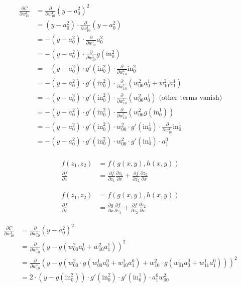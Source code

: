 \documentclass{article}
\begin{document}
    \def\inn{\text{in}}
    \begin{align*}
        \frac{\partial C}{\partial w_{10}^1} 
        &= \frac{\partial}{\partial w_{10}^1} (y-a_0^2)^2 \\
        &= (y-a_0^2)\cdot \frac{\partial}{\partial w_{10}^1} (y-a_0^2) \\
        &= -(y-a_0^2)\cdot \frac{\partial}{\partial w_{10}^1} a_0^2 \\
        &= -(y-a_0^2)\cdot \frac{\partial}{\partial w_{10}^1} g(\inn_0^2) \\
        &= -(y-a_0^2)\cdot g'(\inn_0^2) \cdot \frac{\partial}{\partial w_{10}^1} \inn_0^2 \\
        &= -(y-a_0^2)\cdot g'(\inn_0^2) \cdot \frac{\partial}{\partial w_{10}^1} 
        (w_{00}^2a_0^1 + w_{10}^2 a_1^1)  \\
        &= -(y-a_0^2)\cdot g'(\inn_0^2) \cdot \frac{\partial}{\partial w_{10}^1} 
        (w_{00}^2a_0^1)  \text{ (other terms vanish)}\\
        &= -(y-a_0^2)\cdot g'(\inn_0^2) \cdot \frac{\partial}{\partial w_{10}^1} 
        (w_{00}^2 g(\inn_0^1))  \\
        &= -(y-a_0^2)\cdot g'(\inn_0^2) \cdot w_{00}^2 \cdot 
        g'(\inn_0^1) \cdot \frac{\partial}{\partial w_{10}^1} \inn_0^1 \\
        &= -(y-a_0^2)\cdot g'(\inn_0^2) \cdot w_{00}^2 \cdot 
        g'(\inn_0^1) \cdot a_1^0 \\
    \end{align*}

    \begin{align*}
        f(z_1,z_2) &= f(g(x,y), h(x,y))\\
        \frac{\partial f}{\partial x} 
        &= \frac{\partial f}{\partial z_1}\frac{\partial z_1}{\partial x} +  \frac{\partial f}{\partial z_2}\frac{\partial z_2}{\partial x}
    \end{align*}

    \begin{align*}
        f(z_1,z_2) &= f(g(x,y), h(x,y))\\
        \frac{\partial f}{\partial x} 
        &= \frac{\partial g}{\partial x}\frac{\partial f}{\partial z_1} +  \frac{\partial f}{\partial z_2}\frac{\partial z_2}{\partial x}
    \end{align*}


    \begin{align*}
        \frac{\partial C}{\partial w_{10}^1} 
        &= \frac{\partial}{\partial w_{10}^1} (y-a_0^2)^2 \\
        &= \frac{\partial}{\partial w_{10}^1} \left(y-g(w_{00}^2 a_0^1  + w_{10}^2 a_1^1)\right)^2 \\
        &= \frac{\partial}{\partial w_{10}^1} \left(y-g(w_{00}^2 \cdot g(w_{00}^1 a_0^0 + w_{10}^1 a_1^0) 
        + w_{10}^2 \cdot g(w_{01}^1 a_0^0 + w_{11}^1 a_1^0 ))\right)^2 \\
        &= 2\cdot (y-g(\inn_0^2)) \cdot g'(\inn_0^2) 
        \cdot g'(\inn_0^1) \cdot a_1^0 w_{00}^2
    \end{align*}
\end{document}
